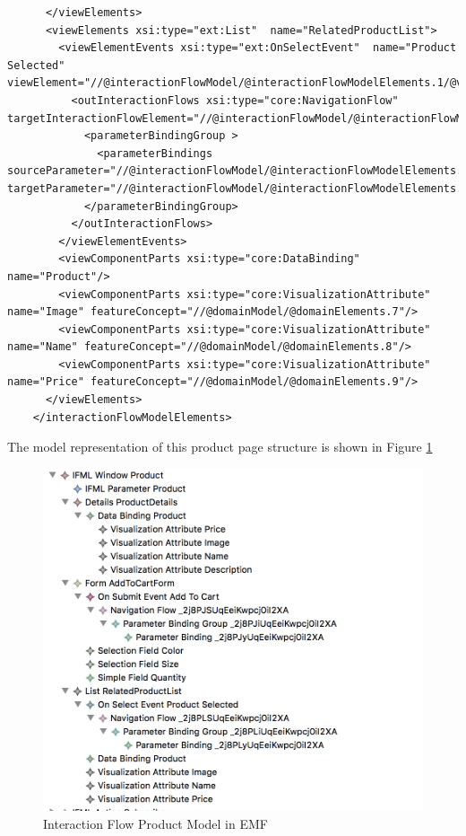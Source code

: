 \begin{lstlisting}
      </viewElements>
      <viewElements xsi:type="ext:List"  name="RelatedProductList">
        <viewElementEvents xsi:type="ext:OnSelectEvent"  name="Product Selected" viewElement="//@interactionFlowModel/@interactionFlowModelElements.1/@viewElements.2">
          <outInteractionFlows xsi:type="core:NavigationFlow"  targetInteractionFlowElement="//@interactionFlowModel/@interactionFlowModelElements.1">
            <parameterBindingGroup >
              <parameterBindings  sourceParameter="//@interactionFlowModel/@interactionFlowModelElements.0/@viewElements.2/@parameters.0" targetParameter="//@interactionFlowModel/@interactionFlowModelElements.1/@parameters.0"/>
            </parameterBindingGroup>
          </outInteractionFlows>
        </viewElementEvents>
        <viewComponentParts xsi:type="core:DataBinding"  name="Product"/>
        <viewComponentParts xsi:type="core:VisualizationAttribute"  name="Image" featureConcept="//@domainModel/@domainElements.7"/>
        <viewComponentParts xsi:type="core:VisualizationAttribute"  name="Name" featureConcept="//@domainModel/@domainElements.8"/>
        <viewComponentParts xsi:type="core:VisualizationAttribute"  name="Price" featureConcept="//@domainModel/@domainElements.9"/>
      </viewElements>
    </interactionFlowModelElements>
\end{lstlisting}


The model representation of this product page structure is shown in Figure \ref{fig:ifml-before-hierarchy-product}

\vspace{0.5cm}
\begin{figure}[H]
  \centering
    \includegraphics[width=13cm]{images/diagrams/before/ifml-hierarchy-product.png}
  \caption{Interaction Flow Product Model in EMF}
  \label{fig:ifml-before-hierarchy-product}
\end{figure}
\vspace{0.5cm}

